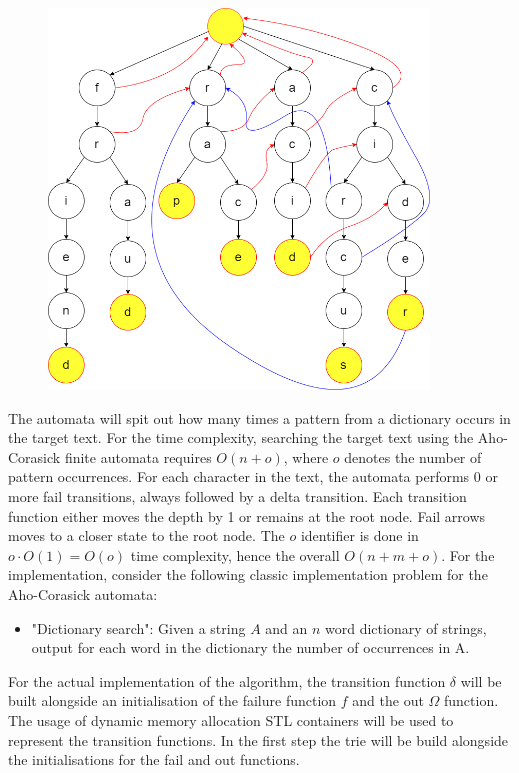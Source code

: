 \documentclass[letterpaper]{article}
\begin{document}
\begin{figure} [h!]
\centering
\includegraphics[width=0.90\textwidth]{pngOfDiagrams/aho3.png}
\end{figure}

The automata will spit out how many times a pattern from a dictionary occurs in the target text. For the time complexity, searching the target text using the Aho-Corasick finite automata requires $O(n + o)$, where $o$ denotes the number of pattern occurrences. For each character in the text, the automata performs $0$ or more fail transitions, always followed by a delta transition. Each transition function either moves the depth by 1 or remains at the root node. Fail arrows moves to a closer state to the root node. The $o$ identifier is done in $o \cdot O(1) = O(o)$ time complexity, hence the overall $O(n + m + o)$. For the implementation, consider the following classic implementation problem for the Aho-Corasick automata:

\begin{itemize}
    \item "Dictionary search": Given a string $A$ and an $n$ word dictionary of strings, output for each word in the dictionary the number of occurrences in A.
\end{itemize}

For the actual implementation of the algorithm, the transition function $\delta$ will be built alongside an initialisation of the failure function $f$ and the out $\Omega$ function. The usage of dynamic memory allocation STL containers will be used to represent the transition functions. In the first step the trie will be build alongside the initialisations for the fail and out functions.
\end{document}
